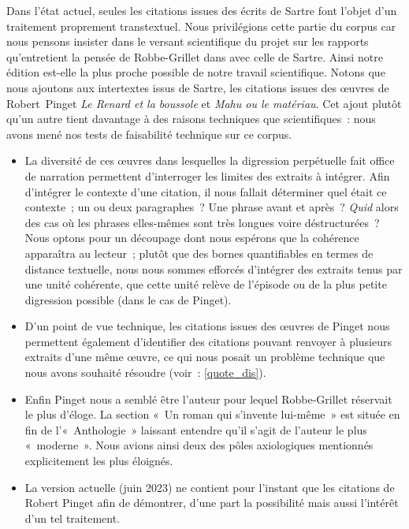 Dans l'état actuel, seules les citations issues des écrits de Sartre font l'objet d'un traitement proprement transtextuel. Nous privilégions cette partie du corpus car nous pensons insister dans le versant scientifique du projet sur les rapports qu'entretient la pensée de Robbe-Grillet dans \punr{} avec celle de Sartre. Ainsi notre édition est-elle la plus proche possible de notre travail scientifique. %
Notons que nous ajoutons aux intertextes issus de Sartre, les citations issues des œuvres de Robert~Pinget \textit{Le Renard et la boussole} et \textit{Mahu ou le matériau}. Cet ajout plutôt qu'un autre tient davantage à des raisons techniques que scientifiques~: nous avons mené nos tests de faisabilité technique sur ce corpus.
\begin{itemize}
    \item La diversité de ces œuvres dans lesquelles la digression perpétuelle fait office de narration permettent d'interroger les limites des extraits à intégrer. Afin d'intégrer le contexte d'une citation, il nous fallait déterminer quel était ce contexte~; un ou deux paragraphes~? Une phrase avant et après~? \textit{Quid} alors des cas où les phrases elles-mêmes sont très longues voire déstructurées~? Nous optons pour un découpage dont nous espérons que la cohérence apparaîtra au lecteur~; plutôt que des bornes quantifiables en termes de distance textuelle, nous nous sommes efforcés d'intégrer des extraits tenus par une unité cohérente, que cette unité relève de l'épisode ou de la plus petite digression possible (dans le cas de Pinget).
    \item D'un point de vue technique, les citations issues des œuvres de Pinget nous permettent également d'identifier des citations pouvant renvoyer à plusieurs extraits d'une même œuvre, ce qui nous posait un problème technique que nous avons souhaité résoudre (voir~: \ref{quote_dis}).
    \item Enfin Pinget nous a semblé être l'auteur pour lequel Robbe-Grillet réservait le plus d'éloge. La section «~Un roman qui s'invente lui-même~» est située en fin de l'«~Anthologie~» laissant entendre qu'il s'agit de l'auteur le plus «~moderne~».
    Nous avions ainsi deux des pôles axiologiques mentionnés explicitement les plus éloignés.
    \item La version actuelle (juin 2023) ne contient pour l'instant que les citations de Robert Pinget afin de démontrer, d'une part la possibilité mais aussi l'intérêt d'un tel traitement.
\end{itemize}

